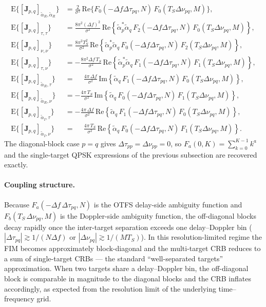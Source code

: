 \documentclass[11pt]{article}
\begin{document}
\begin{align}
    \mathrm{E}\{[\bm{J}_{p,q}]_{\tilde{\alpha}_R,\tilde{\alpha}_R}\} &=
        \tfrac{2}{\sigma^2}\,\text{Re}\{F_0(-\Delta f\Delta\tau_{pq},N)\,F_0(T_S\Delta\nu_{pq},M)\}, \\
    \mathrm{E}\{[\bm{J}_{p,q}]_{\tau,\tau}\} &=
        \tfrac{8\pi^2 (\Delta f)^2}{\sigma^2}\,\text{Re}\!\left\{\tilde{\alpha}_p^*\tilde{\alpha}_q\,
        F_2(-\Delta f\Delta\tau_{pq},N)\, F_0(T_S\Delta\nu_{pq},M)\right\}, \\
    \mathrm{E}\{[\bm{J}_{p,q}]_{\nu,\nu}\} &=
        \tfrac{8\pi^2 T_S^2}{\sigma^2}\,\text{Re}\!\left\{\tilde{\alpha}_p^*\tilde{\alpha}_q\,
        F_0(-\Delta f\Delta\tau_{pq},N)\, F_2(T_S\Delta\nu_{pq},M)\right\}, \\
    \mathrm{E}\{[\bm{J}_{p,q}]_{\tau,\nu}\} &=
        -\tfrac{8\pi^2 \Delta f\, T_S}{\sigma^2}\,\text{Re}\!\left\{\tilde{\alpha}_p^*\tilde{\alpha}_q\,
        F_1(-\Delta f\Delta\tau_{pq},N)\, F_1(T_S\Delta\nu_{pq},M)\right\}, \\
    \mathrm{E}\{[\bm{J}_{p,q}]_{\tilde{\alpha}_R,\tau}\} &=
        \phantom{-}\tfrac{4\pi\,\Delta f}{\sigma^2}\,
        \text{Im}\!\left\{\tilde{\alpha}_q\, F_1(-\Delta f\Delta\tau_{pq},N)\, F_0(T_S\Delta\nu_{pq},M)\right\}, \\
    \mathrm{E}\{[\bm{J}_{p,q}]_{\tilde{\alpha}_R,\nu}\} &=
        -\tfrac{4\pi\, T_S}{\sigma^2}\,
        \text{Im}\!\left\{\tilde{\alpha}_q\, F_0(-\Delta f\Delta\tau_{pq},N)\, F_1(T_S\Delta\nu_{pq},M)\right\}, \\
    \mathrm{E}\{[\bm{J}_{p,q}]_{\tilde{\alpha}_I,\tau}\} &=
        -\tfrac{4\pi\,\Delta f}{\sigma^2}\,
        \text{Re}\!\left\{\tilde{\alpha}_q\, F_1(-\Delta f\Delta\tau_{pq},N)\, F_0(T_S\Delta\nu_{pq},M)\right\}, \\
    \mathrm{E}\{[\bm{J}_{p,q}]_{\tilde{\alpha}_I,\nu}\} &=
        \phantom{-}\tfrac{4\pi\, T_S}{\sigma^2}\,
        \text{Re}\!\left\{\tilde{\alpha}_q\, F_0(-\Delta f\Delta\tau_{pq},N)\, F_1(T_S\Delta\nu_{pq},M)\right\}.
\end{align}
The diagonal-block case \(p=q\) gives
\(\Delta\tau_{pp} = \Delta\nu_{pp} = 0\), so
\(F_a(0,K) = \sum_{k=0}^{K-1} k^a\) and the single-target QPSK
expressions of the previous subsection are recovered exactly.

\paragraph{Coupling structure.} Because
\(F_a(-\Delta f\,\Delta\tau_{pq},N)\) is the OTFS delay-side
ambiguity function and \(F_b(T_S\,\Delta\nu_{pq},M)\) is the
Doppler-side ambiguity function, the off-diagonal blocks decay rapidly
once the inter-target separation exceeds one delay--Doppler bin
(\(|\Delta\tau_{pq}|\gtrsim 1/(N\Delta f)\) or
\(|\Delta\nu_{pq}|\gtrsim 1/(MT_S)\)). In this resolution-limited
regime the FIM becomes approximately block-diagonal and the multi-target
CRB reduces to a sum of single-target CRBs --- the standard
``well-separated targets'' approximation. When two targets share a
delay--Doppler bin, the off-diagonal block is comparable in magnitude to
the diagonal blocks and the CRB inflates accordingly, as expected from
the resolution limit of the underlying time--frequency grid.
\end{document}
